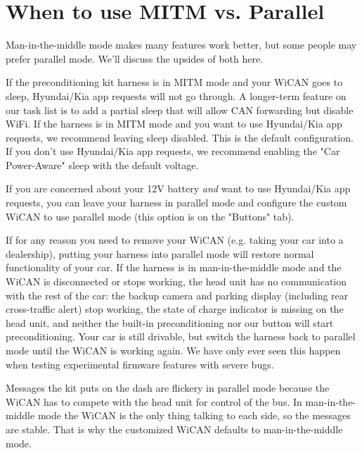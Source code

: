 \documentclass[superscriptaddress,onecolumn,floatfix]{revtex4-2}
\begin{document}
\section{When to use MITM vs. Parallel}
Man-in-the-middle mode makes many features work better, but some people may prefer parallel mode. We'll discuss the upsides of both here.

If the preconditioning kit harness is in MITM mode and your WiCAN goes to sleep, Hyundai/Kia app requests will not go through. A longer-term feature on our task list is to add a partial sleep that will allow CAN forwarding but disable WiFi. If the harness is in MITM mode and you want to use Hyundai/Kia app requests, we recommend leaving sleep disabled. This is the default configuration. If you don't use Hyundai/Kia app requests, we recommend enabling the "Car Power-Aware" sleep with the default voltage. 

If you are concerned about your 12V battery {\it and} want to use Hyundai/Kia app requests, you can leave your harness in parallel mode and configure the custom WiCAN to use parallel mode (this option is on the "Buttons" tab).

If for any reason you need to remove your WiCAN (e.g. taking your car into a dealership), putting your harness into parallel mode will restore normal functionality of your car. If the harness is in man-in-the-middle mode and the WiCAN is disconnected or stops working, the head unit has no communication with the rest of the car: the backup camera and parking display (including rear cross-traffic alert) stop working, the state of charge indicator is missing on the head unit, and neither the built-in preconditioning nor our button will start preconditioning. Your car is still drivable, but switch the harness back to parallel mode until the WiCAN is working again. We have only ever seen this happen when testing experimental firmware features with severe bugs.

Messages the kit puts on the dash are flickery in parallel mode because the WiCAN has to compete with the head unit for control of the bus. In man-in-the-middle mode the WiCAN is the only thing talking to each side, so the messages are stable. That is why the customized WiCAN defaults to man-in-the-middle mode.
\appendix
\end{document}
